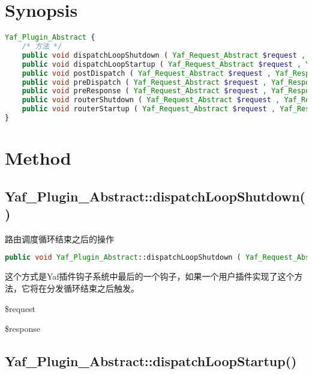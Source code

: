 \section{Synopsis}


\begin{lstlisting}[language=PHP]
Yaf_Plugin_Abstract {
    /* 方法 */
    public void dispatchLoopShutdown ( Yaf_Request_Abstract $request , Yaf_Response_Abstract $response )
    public void dispatchLoopStartup ( Yaf_Request_Abstract $request , Yaf_Response_Abstract $response )
    public void postDispatch ( Yaf_Request_Abstract $request , Yaf_Response_Abstract $response )
    public void preDispatch ( Yaf_Request_Abstract $request , Yaf_Response_Abstract $response )
    public void preResponse ( Yaf_Request_Abstract $request , Yaf_Response_Abstract $response )
    public void routerShutdown ( Yaf_Request_Abstract $request , Yaf_Response_Abstract $response )
    public void routerStartup ( Yaf_Request_Abstract $request , Yaf_Response_Abstract $response )
}
\end{lstlisting}




\section{Method}

\subsection{Yaf\_Plugin\_Abstract::dispatchLoopShutdown()}


路由调度循环结束之后的操作



\begin{lstlisting}[language=PHP]
public void Yaf_Plugin_Abstract::dispatchLoopShutdown ( Yaf_Request_Abstract $request , Yaf_Response_Abstract $response )
\end{lstlisting}

这个方式是Yaf插件钩子系统中最后的一个钩子，如果一个用户插件实现了这个方法，它将在分发循环结束之后触发。

\begin{compactitem}
\item \$request
\item \$response
\end{compactitem}



\subsection{Yaf\_Plugin\_Abstract::dispatchLoopStartup()}

